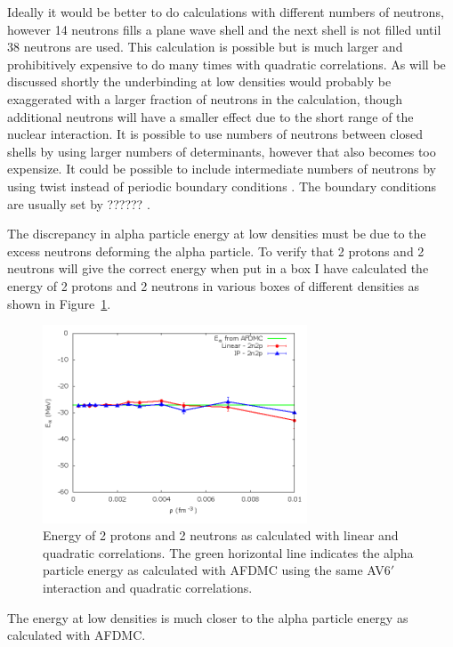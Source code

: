 Ideally it would be better to do calculations with different numbers of neutrons, however 14 neutrons fills a plane wave shell and the next shell is not filled until 38 neutrons are used. This calculation is possible but is much larger and prohibitively expensive to do many times with quadratic correlations. As will be discussed shortly the underbinding at low densities would probably be exaggerated with a larger fraction of neutrons in the calculation, though additional neutrons will have a smaller effect due to the short range of the nuclear interaction. It is possible to use numbers of neutrons between closed shells by using larger numbers of determinants, however that also becomes too expensize. It could be possible to include intermediate numbers of neutrons by using twist instead of periodic boundary conditions \cite{lin2001}. The boundary conditions are usually set by ?????? .

The discrepancy in alpha particle energy at low densities must be due to the excess neutrons deforming the alpha particle. To verify that 2 protons and 2 neutrons will give the correct energy when put in a box I have calculated the energy of 2 protons and 2 neutrons in various boxes of different densities as shown in Figure~\ref{fig:alpha2n2p}.
\begin{figure}[h!]
   \centering
   \includegraphics[width=0.7\textwidth]{figures/2n2p.png}
   \caption{Energy of 2 protons and 2 neutrons as calculated with linear and quadratic correlations. The green horizontal line indicates the alpha particle energy as calculated with AFDMC using the same AV6$'$ interaction and quadratic correlations.}
   \label{fig:alpha2n2p}
\end{figure}
The energy at low densities is much closer to the alpha particle energy as calculated with AFDMC.

